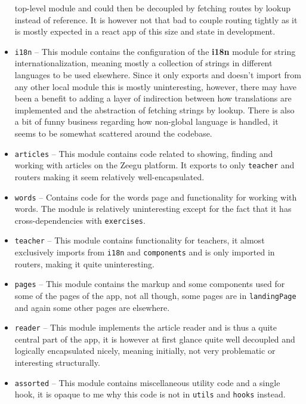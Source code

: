 \documentclass{article}
\begin{document}
\begin{itemize}
                                                                                     top-level module and could then be decoupled by fetching routes by lookup instead of reference. It is however not that bad to couple routing tightly as it is mostly expected in a react app of this size and state in development.
  \item \verb|i18n| -- This module contains the configuration of the \textbf{i18n} module for string internationalization,
                       meaning mostly a collection of strings in different languages to be used elsewhere.
                       Since it only exports and doesn't import from any other local module this is mostly uninteresting,
                       however, there may have been a benefit to adding a layer of indirection between how translations are implemented
                       and the abstraction of fetching strings by lookup. There is also a bit of funny business regarding how non-global
                       language is handled, it seems to be somewhat scattered around the codebase.
  \item \verb|articles| -- This module contains code related to showing, finding and working with articles on the Zeegu platform.
                           It exports to only \verb|teacher| and routers making it seem relatively well-encapsulated.
  \item \verb|words| -- Contains code for the words page and functionality for working with words.
                        The module is relatively uninteresting except for the fact that it has cross-dependencies with \verb|exercises|.
  \item \verb|teacher| -- This module contains functionality for teachers, 
                          it almost exclusively imports from \verb|i18n| and \verb|components|
                          and is only imported in routers, making it quite uninteresting.
  \item \verb|pages| -- This module contains the markup and some components used for some of the pages of the app,
                        not all though, some pages are in \verb|landingPage| and again some other pages are elsewhere.
  \item \verb|reader| -- This module implements the article reader and is thus a quite central part of the app,
                         it is however at first glance quite well decoupled and logically encapsulated nicely,
                         meaning initially, not very problematic or interesting structurally.
  \item \verb|assorted| -- This module contains miscellaneous utility code and a single hook,
                           it is opaque to me why this code is not in \verb|utils| and \verb|hooks| instead.
\end{itemize}
\end{document}
